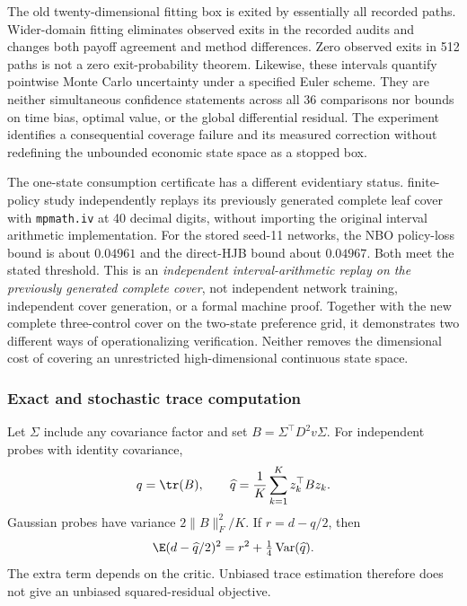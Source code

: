 The old twenty-dimensional fitting box is exited by essentially all recorded paths. Wider-domain fitting eliminates observed exits in the recorded audits and changes both payoff agreement and method differences. Zero observed exits in 512 paths is not a zero exit-probability theorem. Likewise, these intervals quantify pointwise Monte Carlo uncertainty under a specified Euler scheme. They are neither simultaneous confidence statements across all 36 comparisons nor bounds on time bias, optimal value, or the global differential residual. The experiment identifies a consequential coverage failure and its measured correction without redefining the unbounded economic state space as a stopped box.

The one-state consumption certificate has a different evidentiary status. finite-policy study independently replays its previously generated complete leaf cover with \texttt{mpmath.iv} at 40 decimal digits, without importing the original interval arithmetic implementation. For the stored seed-11 networks, the NBO policy-loss bound is about $0.04961$ and the direct-HJB bound about $0.04967$. Both meet the stated threshold. This is an \emph{independent interval-arithmetic replay on the previously generated complete cover}, not independent network training, independent cover generation, or a formal machine proof. Together with the new complete three-control cover on the two-state preference grid, it demonstrates two different ways of operationalizing verification. Neither removes the dimensional cost of covering an unrestricted high-dimensional continuous state space.



\subsubsection{Exact and stochastic trace computation}
Let $\Sigma$ include any covariance factor and set $B=\Sigma^\top D^2v\Sigma$. For independent probes with identity covariance,
\begin{equation}\label{eq:trace}
 q=\tr(B),\qquad \widehat q=\frac1K\sum_{k=1}^Kz_k^\top Bz_k.
\end{equation}
Gaussian probes have variance $2\|B\|_F^2/K$. If $r=d-q/2$, then
\begin{equation}\label{eq:tracebias}
 \E(d-\widehat q/2)^2=r^2+\tfrac14\operatorname{Var}(\widehat q).
\end{equation}
The extra term depends on the critic. Unbiased trace estimation therefore does not give an unbiased squared-residual objective.

